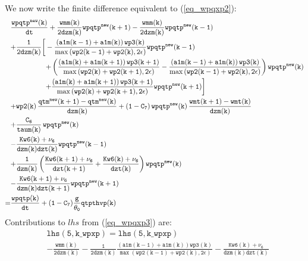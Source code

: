 \documentclass[11pt,fleqn]{article}
\begin{document}
We now write
the finite difference equivalent to (\ref{eq_wpqxp2}):
%
\begin{equation}
\label{eq_wpqxp3}
\begin{split}
& \mathtt{
  \frac{wpqtp^{new}(k)}{dt}
  + \frac{wmm(k)}{2 dzm(k)} wpqtp^{new}(k+1)
  - \frac{wmm(k)}{2 dzm(k)} wpqtp^{new}(k-1)
  } \\
& \mathtt{
  + \frac{1}{2 dzm(k)}
    \bigg[ -\frac{\left(a1m(k-1)+a1m(k)\right) wp3(k)}
                 {\max\left(wp2(k-1)+wp2(k),2\epsilon\right)}
            wpqtp^{new}(k-1)
  } \\
& \mathtt{ \quad \quad \quad \quad \quad
          + \left( 
             \frac{\left(a1m(k)+a1m(k+1)\right) wp3(k+1)}
                 {\max\left(wp2(k)+wp2(k+1),2\epsilon\right)}
            -\frac{\left(a1m(k-1)+a1m(k)\right) wp3(k)}
                 {\max\left(wp2(k-1)+wp2(k),2\epsilon\right)}
            \right)
            wpqtp^{new}(k)
  } \\
& \mathtt{ \quad \quad \quad \quad \quad
           + \frac{\left(a1m(k)+a1m(k+1)\right) wp3(k+1)}
                 {\max\left(wp2(k)+wp2(k+1),2\epsilon\right)}
            wpqtp^{new}(k+1)
    \bigg]
  } \\
& \mathtt{
  + wp2(k) \, \frac{qtm^{new}(k+1)-qtm^{new}(k)}{dzm(k)}
  + (1-C_7) \, wpqtp^{new}(k) \, \frac{wmt(k+1)-wmt(k)}{dzm(k)}
  } \\
& \mathtt{
  + \frac{C_6}{taum(k)} \, wpqtp^{new}(k)
  } \\
& \mathtt{
  - \frac{Kw6(k)+\nu_6}{dzm(k)dzt(k)} wpqtp^{new}(k-1)
  } \\
& \mathtt{
  + \frac{1}{dzm(k)} \left(   \frac{Kw6(k+1)+\nu_6}{dzt(k+1)}
                            + \frac{Kw6(k)+\nu_6}{dzt(k)} \right) wpqtp^{new}(k)
  } \\
& \mathtt{
  - \frac{Kw6(k+1)+\nu_6}{dzm(k)dzt(k+1)} wpqtp^{new}(k+1)
  } \\
=& \mathtt{ \frac{wpqtp(k)}{dt} + (1-C_7) \frac{g}{\theta_0} qtpthvp(k) }
\end{split}
\end{equation}
%
Contributions to $lhs$ from (\ref{eq_wpqxp3}) are:
%
\begin{equation}
\begin{split}
&  \mathtt{ lhs(5,k\_wpxp) = lhs(5,k\_wpxp) } \\
&  \mathtt{
- \frac{wmm(k)}{2 dzm(k)}
- \frac{1}{2 dzm(k)}
  \frac{\left(a1m(k-1)+a1m(k)\right) wp3(k)}
       {\max\left(wp2(k-1)+wp2(k),2\epsilon\right)}
- \frac{Kw6(k)+\nu_6}{dzm(k)dzt(k)}
  }
\end{split}
\end{equation}
\end{document}
